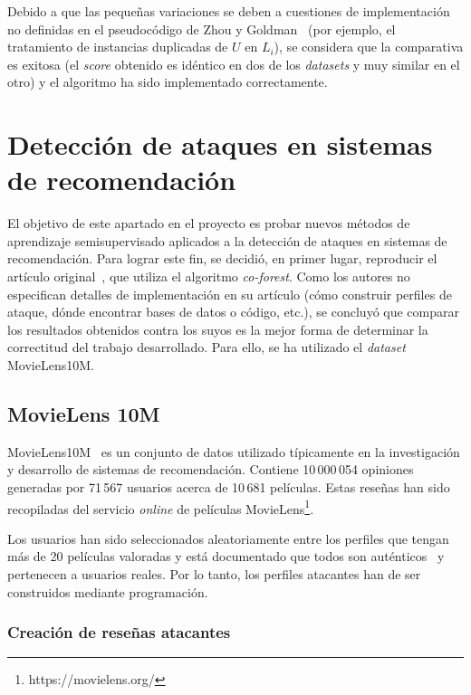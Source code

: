Debido a que las pequeñas variaciones se deben a cuestiones de implementación no definidas en el pseudocódigo de Zhou y Goldman~\cite{democraticCoLearning2004original} (por ejemplo, el tratamiento de instancias duplicadas de $U$ en $L_i$), se considera que la comparativa es exitosa (el \textit{score} obtenido es idéntico en dos de los \textit{datasets} y muy similar en el otro) y el algoritmo ha sido implementado correctamente.


\section{Detección de ataques en sistemas de recomendación}
\label{sec:5_detec_ataques}
El objetivo de este apartado en el proyecto es probar nuevos métodos de aprendizaje semisupervisado aplicados a la detección de ataques en sistemas de recomendación. Para lograr este fin, se decidió, en primer lugar, reproducir el artículo original~\cite{zhou2021SemisupervisedRecommendationAttack}, que utiliza el algoritmo \textit{co-forest}. Como los autores no especifican detalles de implementación en su artículo (cómo construir perfiles de ataque, dónde encontrar bases de datos o código, etc.), se concluyó que comparar los resultados obtenidos contra los suyos es la mejor forma de determinar la correctitud del trabajo desarrollado. Para ello, se ha utilizado el \textit{dataset} MovieLens10M.

\subsection{MovieLens 10M}

MovieLens10M~\cite{groupLensDatasets} es un conjunto de datos utilizado típicamente en la investigación y desarrollo de sistemas de recomendación. Contiene 10\,000\,054 opiniones generadas por 71\,567 usuarios acerca de 10\,681 películas. Estas reseñas han sido recopiladas del servicio \textit{online} de películas MovieLens\footnote{https://movielens.org/}.

Los usuarios han sido seleccionados aleatoriamente entre los perfiles que tengan más de 20 películas valoradas y está documentado que todos son auténticos~\cite{zhou2021SemisupervisedRecommendationAttack} y pertenecen a usuarios reales. Por lo tanto, los perfiles atacantes han de ser construidos mediante programación.

\subsubsection{Creación de reseñas atacantes}
\label{sec:creacion_reseñas_atacantes}

